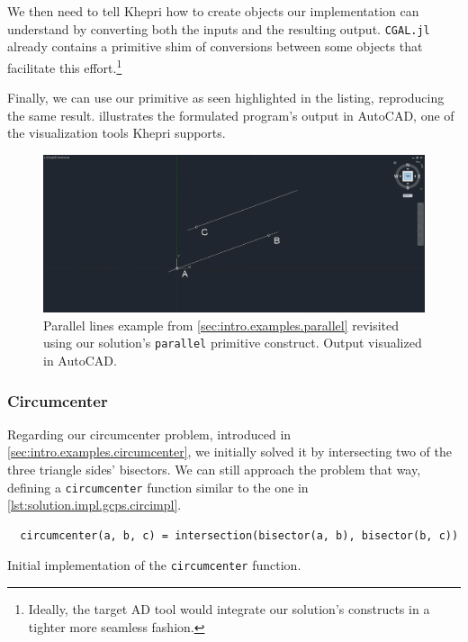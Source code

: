 We then need to tell Khepri how to create objects our implementation can
understand by converting both the inputs and the resulting output.
\texttt{CGAL.jl} already contains a primitive shim of conversions between some
objects that facilitate this effort.\footnote{Ideally, the target \ac{AD} tool
would integrate our solution's constructs in a tighter more seamless fashion.}

Finally, we can use our primitive as seen highlighted in the listing,
reproducing the same result.  illustrates
the formulated program's output in AutoCAD, one of the visualization tools
Khepri supports.

\begin{figure}[htbp]
  \includegraphics[width=\linewidth]{fig/autocad-parallel} 
  \caption[Parallel lines example using our solution]{
    Parallel lines example from \cref{sec:intro.examples.parallel} revisited
    using our solution's \texttt{parallel} primitive construct.  Output
    visualized in AutoCAD.}%
  \label{fig:solution.impl.gcps.parallel}
\end{figure}

\subsubsection{Circumcenter}%
\label{sec:solution.impl.gcps.circumcenter}

Regarding our circumcenter problem, introduced in
\cref{sec:intro.examples.circumcenter}, we initially solved it by intersecting
two of the three triangle sides' bisectors.  We can still approach the problem
that way, defining a \texttt{circumcenter} function similar to the one in
\cref{lst:solution.impl.gcps.circimpl}.

\begin{listing}[htb]
  \begin{verbatim}
  circumcenter(a, b, c) = intersection(bisector(a, b), bisector(b, c)) 
  \end{verbatim}
  \caption[Initial circumcenter solution]{
    Initial implementation of the \texttt{circumcenter} function.}%
  \label{lst:solution.impl.gcps.circimpl}
\end{listing}


